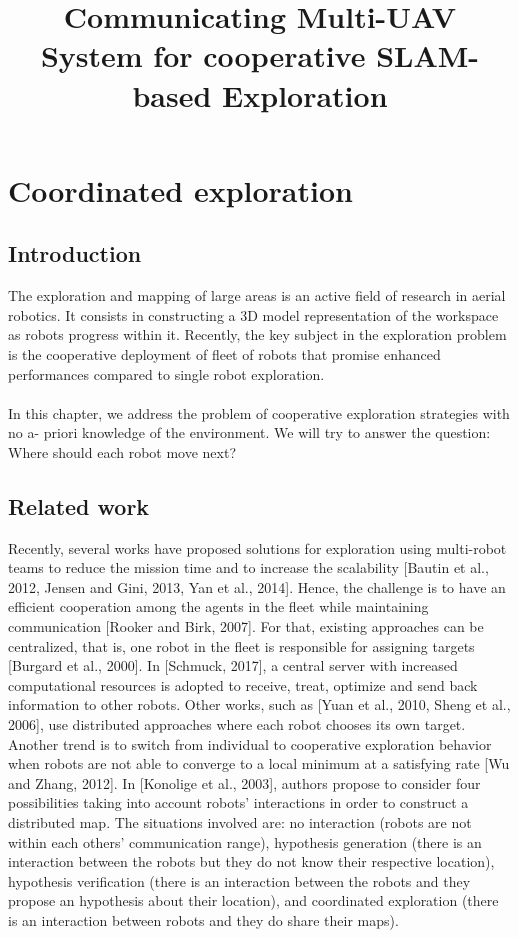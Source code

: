\documentclass[11pt,openany]{book}
\title{Communicating Multi-UAV System for cooperative SLAM-based Exploration}
\begin{document}
\chapter{Coordinated exploration}
\section{Introduction}
The exploration and mapping of large areas is an active ﬁeld of research in aerial robotics. It consists in constructing a 3D model representation of the workspace as robots progress within it. Recently, the key subject in the exploration problem is the cooperative deployment of ﬂeet of robots that promise enhanced performances compared to single robot exploration.\\\\
In this chapter, we address the problem of cooperative exploration strategies with no a- priori knowledge of the environment. We will try to answer the question: Where should each robot move next?
\section{Related work}
Recently, several works have proposed solutions for exploration using multi-robot teams to reduce the mission time and to increase the scalability [Bautin et al., 2012, Jensen and Gini, 2013, Yan et al., 2014]. Hence, the challenge is to have an eﬃcient cooperation among the agents in the ﬂeet while maintaining communication [Rooker and Birk, 2007]. For that, existing approaches can be centralized, that is, one robot in the ﬂeet is responsible for assigning targets [Burgard et al., 2000]. In [Schmuck, 2017], a central server with increased computational resources is adopted to receive, treat, optimize and send back information to other robots. Other works, such as [Yuan et al., 2010, Sheng et al., 2006], use distributed approaches where each robot chooses its own target. Another trend is to switch from individual to cooperative exploration behavior when robots are not able to converge to a local minimum at a satisfying rate [Wu and Zhang, 2012]. In [Konolige et al., 2003], authors propose to consider four possibilities taking into account robots’ interactions in order to construct a distributed map. The situations involved are: no interaction (robots are not within each others’ communication range), hypothesis generation (there is an interaction between the robots but they do not know their respective location), hypothesis veriﬁcation (there is an interaction between the robots and they propose an hypothesis about their location), and coordinated exploration (there is an interaction between robots and they do share their maps).
\end{document}
